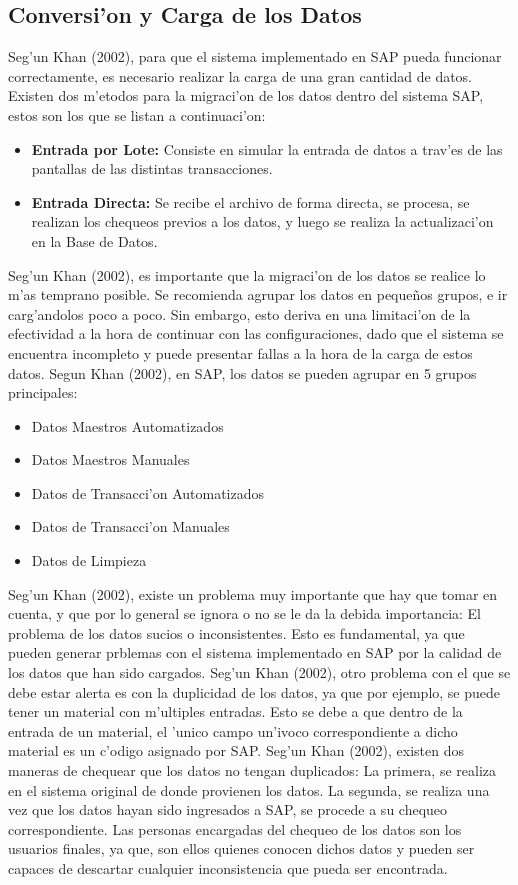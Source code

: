 \subsection{Conversi'on y Carga de los Datos}
	Seg'un Khan (2002), para que el sistema implementado en SAP pueda funcionar correctamente, es necesario realizar la carga de una gran cantidad de datos. 
	Existen dos m'etodos para la migraci'on de los datos dentro del sistema SAP, estos son los que se listan a continuaci'on:
\begin{itemize}
\item \textbf{Entrada por Lote:} Consiste en simular la entrada de datos a trav'es de las pantallas de las distintas transacciones.
\item \textbf{Entrada Directa:} Se recibe el archivo de forma directa, se procesa, se realizan los chequeos previos a los datos, y luego se realiza la actualizaci'on en la Base de Datos.
\end{itemize}
	Seg'un Khan (2002), es importante que la migraci'on de los datos se realice lo m'as temprano posible. Se recomienda agrupar los datos en peque\~nos grupos, e ir carg'andolos poco a poco. Sin embargo, esto deriva en una limitaci'on de la efectividad a la hora de continuar con las configuraciones, dado que el sistema se encuentra incompleto y puede presentar fallas a la hora de la carga de estos datos.
\newline
\newline
\indent Segun Khan (2002), en SAP, los datos se pueden agrupar en 5 grupos principales:
\begin{itemize}
\item Datos Maestros Automatizados
\item Datos Maestros Manuales
\item Datos de Transacci'on Automatizados
\item Datos de Transacci'on Manuales
\item Datos de Limpieza
\end{itemize}
\indent Seg'un Khan (2002), existe un problema muy importante que hay que tomar en cuenta, y que por lo general se ignora o no se le da la debida importancia: El problema de los datos sucios o inconsistentes. Esto es fundamental, ya que pueden generar prblemas con el sistema implementado en SAP por la calidad de los datos que han sido cargados. 
\newline
\newline
\indent Seg'un Khan (2002), otro problema con el que se debe estar alerta es con la duplicidad de los datos, ya que por ejemplo, se puede tener un material con m'ultiples entradas. Esto se debe a que dentro de la entrada de un material, el 'unico campo un'ivoco correspondiente a dicho material es un c'odigo asignado por SAP. 
\indent Seg'un Khan (2002), existen dos maneras de chequear que los datos no tengan duplicados: La primera, se realiza en el sistema original de donde provienen los datos. La segunda, se realiza una vez que los datos hayan sido ingresados a SAP, se procede a su chequeo correspondiente.
\indent Las personas encargadas del chequeo de los datos son los usuarios finales, ya que, son ellos quienes conocen dichos datos y pueden ser capaces de descartar cualquier inconsistencia que pueda ser encontrada.

